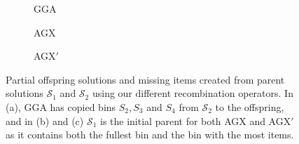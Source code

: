 \documentclass[authoryear]{elsarticle}
\begin{document}
\begin{figure}[H]	
	\centering
	\begin{minipage}{0.3\textwidth}
		
	\end{minipage} \hspace{15mm}
	\begin{minipage}{0.3\textwidth}
		
	\end{minipage}
\end{figure}

\begin{figure}[H]	
	\centering
	\begin{subfigure}[h]{0.3\textwidth}
		
		\caption{GGA}
		\label{fig:gga}
	\end{subfigure} \hspace{5mm}
	\begin{subfigure}[h]{0.3\textwidth}
		
		\caption{AGX}
		\label{fig:agx}
	\end{subfigure} \hspace{5mm}
	\begin{subfigure}[h]{0.3\textwidth}
		
		\caption{AGX$'$}
		\label{fig:agxdash}
	\end{subfigure}
	\caption{Partial offspring solutions and missing items created from parent solutions $\mathcal{S}_1$ and $\mathcal{S}_2$ using our different recombination operators. In (a), GGA has copied bins $S_2, S_3$ and $S_4$ from $\mathcal{S}_2$ to the offspring, and in (b) and (c) $\mathcal{S}_1$ is the initial parent for both AGX and AGX$'$ as it contains both the fullest bin and the bin with the most items.}
	\label{fig:recomb}
\end{figure}
\end{document}
